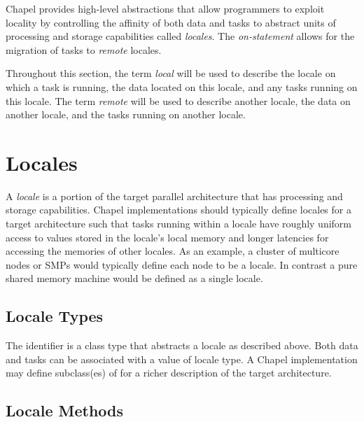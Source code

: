 \label{Locales_Chapter}

Chapel provides high-level abstractions that allow programmers to
exploit locality by controlling the affinity of both data and tasks to
abstract units of processing and storage capabilities
called \emph{locales}.  The \emph{on-statement} allows for the
migration of tasks to \emph{remote} locales.

Throughout this section, the term \emph{local} will be used to
describe the locale on which a task is running, the data located on
this locale, and any tasks running on this locale.  The
term \emph{remote} will be used to describe another locale, the data
on another locale, and the tasks running on another locale.

\section{Locales}
\label{Locales}

A \emph{locale} is a portion of the target parallel architecture that
has processing and storage capabilities.  Chapel implementations
should typically define locales for a target architecture such that
tasks running within a locale have roughly uniform access to values
stored in the locale's local memory and longer latencies for accessing
the memories of other locales.  As an example, a cluster of multicore
nodes or SMPs would typically define each node to be a locale.  In
contrast a pure shared memory machine would be defined as a single
locale.

\subsection{Locale Types}
\label{The_Locale_Type}

The identifier  is a class type that abstracts a
locale as described above.  Both data and tasks can be associated with
a value of locale type.  A Chapel implementation may define subclass(es)
of  for a richer description of the target architecture.

\subsection{Locale Methods}
\label{Locale_Methods}

